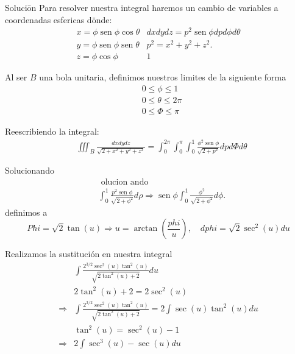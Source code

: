 Soluciōn
Para resolver nuestra integral haremos un cambio de variables a coordenadas esfericas dönde:
$$
\begin{array}{ll}
x=\phi \operatorname{sen} \phi \cos \theta & d x d y d z=p^2 \operatorname{sen} \phi d p d \phi d \theta \\
y=\phi \operatorname{sen} \phi \operatorname{sen} \theta & p^2=x^2+y^2+z^2 . \\
z=\phi \cos \phi & 1
\end{array}
$$

Al ser $B$ una bola unitaria, definimos nuestros limites de la siguiente forma
$$
\begin{aligned}
& 0 \leq \phi \leq 1 \\
& 0 \leq \theta \leq 2 \pi \\
& 0 \leq \Phi \leq \pi
\end{aligned}
$$

Reescribiendo la integral:
$$
\begin{aligned}
& \iiint_B \frac{d x d y d z}{\sqrt{2+x^2+y^2+z^2}}=\int_0^{2 \pi} \int_0^\pi \int_0^1 \frac{\phi^2 \operatorname{sen} \phi}{\sqrt{2+p^2}} d p d \Phi d \theta
\end{aligned}
$$

Solucionando
$$
\begin{aligned}
& \text { olucion ando } \\
& \int_0^1 \frac{p^2 \operatorname{sen} \phi}{\sqrt{2+\phi^2}} d \rho \Rightarrow \operatorname{sen} \phi \int_0^1 \frac{\phi^2}{\sqrt{2+\phi^2}} d \phi.
\end{aligned}
$$
definimos a
$$
Phi=\sqrt{2} \tan (u) \Rightarrow u=\arctan \left(\frac{phi}{u}\right), \quad d phi=\sqrt{2} \sec ^2(u) d u
$$

Realizamos la sustitución en nuestra integral
$$
\begin{aligned}
& \int \frac{2^{3 / 2} \sec ^2(u) \tan ^2(u)}{\sqrt{2 \tan ^2(u)+2}} d u \\
& 2 \tan ^2(u)+2=2 \sec ^2(u) \\
\Rightarrow & \int \frac{2^{3 / 2} \sec ^2(u) \tan ^2(u)}{\sqrt{2 \tan ^2(u)+2}}=2 \int \sec (u) \tan ^2(u) d u \\
& \tan ^2(u)=\sec ^2(u)-1 \\
\Rightarrow & 2 \int \sec ^3(u)-\sec (u) d u
\end{aligned}
$$

